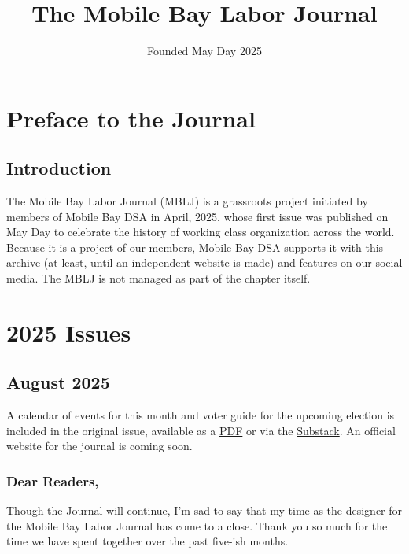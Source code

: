\documentclass[
]{book}
\title{The Mobile Bay Labor Journal}
\author{}
\date{\vspace{-2.5em}Founded May Day 2025}
\begin{document}
\maketitle

{
\setcounter{tocdepth}{1}
\tableofcontents
}
\part{Preface to the Journal}\label{part-preface-to-the-journal}

\chapter*{Introduction}\label{introduction}

The Mobile Bay Labor Journal (MBLJ) is a grassroots project initiated by members of Mobile Bay DSA in April, 2025, whose first issue was published on May Day to celebrate the history of working class organization across the world. Because it is a project of our members, Mobile Bay DSA supports it with this archive (at least, until an independent website is made) and features on our social media. The MBLJ is not managed as part of the chapter itself.

\part{2025 Issues}\label{part-2025-issues}

\chapter*{August 2025}\label{august-2025}

A calendar of events for this month and voter guide for the upcoming election is included in the original issue, available as a \href{https://mobilebaydsa.org/newsletter/august2025.pdf}{PDF} or via the \href{}{Substack}. An official website for the journal is coming soon.

\section*{Dear Readers,}\label{dear-readers}

Though the Journal will continue, I'm sad to say that my time as the designer for the Mobile Bay Labor Journal has come to a close. Thank you so much for the time we have spent together over the past five-ish months.
\end{document}
